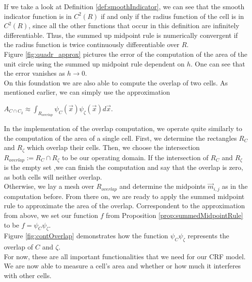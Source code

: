 \documentclass[a4paper,12pt,leqno]{article}
\theoremstyle{plain}
\theoremstyle{remark}
\begin{document}
If we take a look at Definition \ref{def:smoothIndicator}, we can see that the smooth indicator function is in $C^2(R)$ if and only if the radius function of the cell is in $C^2(R)$, since all the other functions that occur in this definition are infinitely differentiable. 
Thus, the summed up midpoint rule is numerically convergent if the radius function is twice continuously differentiable over $R$.\\
Figure \ref{fig:quadr_approx} pictures the error of the computation of the area of the unit circle using the summed up midpoint rule dependent on $h$. One can see that the error vanishes as $h \rightarrow 0$.\\
On this foundation we are also able to compute the overlap of two cells. As mentioned earlier, we can simply use the approximation 
\begin{center}
	$A_{C \cap C_{2}} \approx \int_{R_{overlap}} \psi_{C}(\vec{x})\psi_{\zeta}(\vec{x}) d\vec{x}$.
\end{center}
In the implementation of the overlap computation, we operate quite similarly to the computation of the area of a single cell. First, we determine the rectangles $R_{C}$ and $R_{\zeta}$ which overlap their cells. Then, we choose the intersection $R_{overlap} := R_{C} \cap R_{\zeta}$ to be our operating domain. If the intersection of $R_{C}$ and $R_{\zeta}$ is the empty set ,we can finish the computation and say that the overlap is zero, as both cells will neither overlap. \\
Otherwise, we lay a mesh over $R_{overlap}$ and determine the midpoints $\vec{m}_{i,j}$ as in the computation before. From there on, we are ready to apply the summed midpoint rule to approximate the area of the overlap. Correspondent to the approximation from above, we set our function $f$ from Proposition \ref{prop:summedMidpointRule} to be $f = \psi_{C} \psi_{\zeta}$. \\
Figure \ref{fig:contOverlap} demonstrates how the function $\psi_{C} \psi_{\zeta}$ represents the overlap of $C$ and $\zeta$. \\
For now, these are all important functionalities that we need for our CRF model. We are now able to measure a cell's area and whether or how much it interferes with other cells. 
\end{document}
